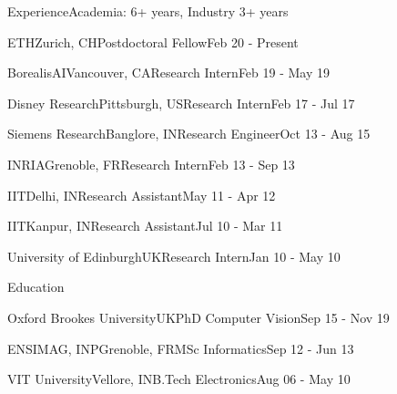 \documentclass{resume} %
\begin{document}

\begin{paracol}{2}
\setlength{\columnsep}{2em}
\begin{rSection}{Experience}{\quad Academia: 6+ years, Industry 3+ years}
\begin{rSubsection}{ETH}{Zurich, CH}{Postdoctoral Fellow}{Feb 20 - Present}\end{rSubsection}
\begin{rSubsection}{BorealisAI}{Vancouver, CA}{Research Intern}{Feb 19 - May 19}\end{rSubsection}
\begin{rSubsection}{Disney Research}{Pittsburgh, US}{Research Intern}{Feb 17 - Jul 17}\end{rSubsection}
\begin{rSubsection}{Siemens Research}{Banglore, IN}{Research Engineer}{Oct 13 - Aug 15}\end{rSubsection}
\begin{rSubsection}{INRIA}{Grenoble, FR}{Research Intern}{Feb 13 - Sep 13}\end{rSubsection}
\begin{rSubsection}{IIT}{Delhi, IN}{Research Assistant}{May 11 - Apr 12}\end{rSubsection}
\begin{rSubsection}{IIT}{Kanpur, IN}{Research Assistant}{Jul 10 - Mar 11}\end{rSubsection}
\begin{rSubsection}{University of Edinburgh}{UK}{Research Intern}{Jan 10 - May 10}\end{rSubsection}
\end{rSection}

\begin{rSection}{Education}{}
\begin{eSubsection}{Oxford Brookes University}{UK}{PhD Computer Vision}{Sep 15 - Nov 19}\end{eSubsection}
\begin{eSubsection}{ENSIMAG, INP}{Grenoble, FR}{MSc Informatics}{Sep 12 - Jun 13}\end{eSubsection}
\begin{eSubsection}{VIT University}{Vellore, IN}{B.Tech Electronics}{Aug 06 - May 10}\end{eSubsection} 
\end{rSection}



\end{paracol}
\end{document}
